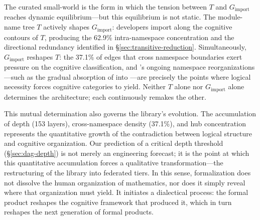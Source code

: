 The curated small-world is the form in which the tension between $T$ and $G_{\mathrm{import}}$ reaches dynamic equilibrium---but this equilibrium is not static. The module-name tree $T$ actively shapes $G_{\mathrm{import}}$: developers import along the cognitive contours of $T$, producing the 62.9\% intra-namespace concentration and the directional redundancy identified in \S\ref{sec:transitive-reduction}. Simultaneously, $G_{\mathrm{import}}$ reshapes $T$: the 37.1\% of edges that cross namespace boundaries exert pressure on the cognitive classification, and 's ongoing namespace reorganizations---such as the gradual absorption of  into ---are precisely the points where logical necessity forces cognitive categories to yield. Neither $T$ alone nor $G_{\mathrm{import}}$ alone determines the architecture; each continuously remakes the other.

This mutual determination also governs the library's evolution. The accumulation of depth (153 layers), cross-namespace density (37.1\%), and hub concentration represents the quantitative growth of the contradiction between logical structure and cognitive organization. Our prediction of a critical depth threshold (\S\ref{sec:dag-depth}) is not merely an engineering forecast; it is the point at which this quantitative accumulation forces a qualitative transformation---the restructuring of the library into federated tiers. In this sense, formalization does not dissolve the human organization of mathematics, nor does it simply reveal where that organization must yield. It initiates a dialectical process: the formal product reshapes the cognitive framework that produced it, which in turn reshapes the next generation of formal products.